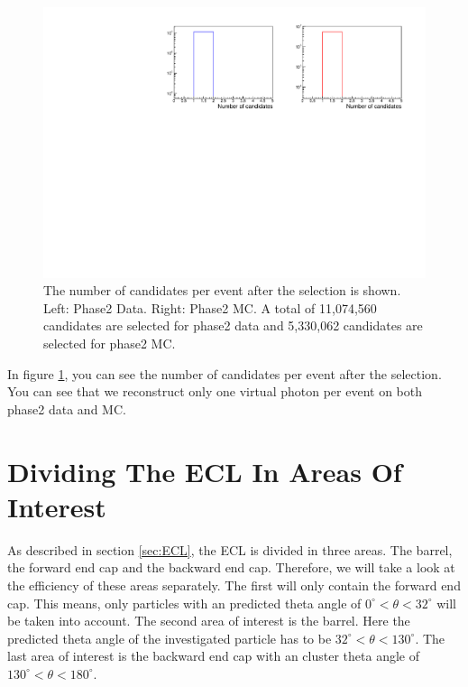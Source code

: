 \documentclass[a4paper,11pt,twosided,final,german,openbib,pdftex,listof=totoc,bibliography=totoc]{scrbook}
\begin{document}
\begin{figure}[h!]
	\includegraphics[width=\textwidth]{Bilder/CCand.pdf}
	\caption[Total Number Of Events After The Selection]{The number of candidates per event after the selection is shown. Left: Phase2 Data. Right: Phase2 MC. A total of 11,074,560 candidates are selected for phase2 data and 5,330,062 candidates are selected for phase2 MC.}
	\label{fig:nCandAS}
\end{figure}








In figure \ref{fig:nCandAS}, you can see the number of candidates per event after the selection. You can see that we reconstruct only one virtual photon per event on both phase2 data and MC.






\section{Dividing The ECL In Areas Of Interest}
\label{sec:DivECL}

As described in section \ref{sec:ECL}, the ECL is divided in three areas. The barrel, the forward end cap and the backward end cap. Therefore, we will take a look at the efficiency of these areas separately. The first will only contain the forward end cap. This means, only particles with an predicted theta angle of $0^\circ <\theta<32^\circ$ will be taken into account. The second area of interest is the barrel. Here the predicted theta angle of the investigated particle has to be $32^\circ < \theta < 130^\circ$. The last area of interest is the backward end cap with an cluster theta angle of $130^\circ <\theta < 180^\circ$.  
\end{document}
